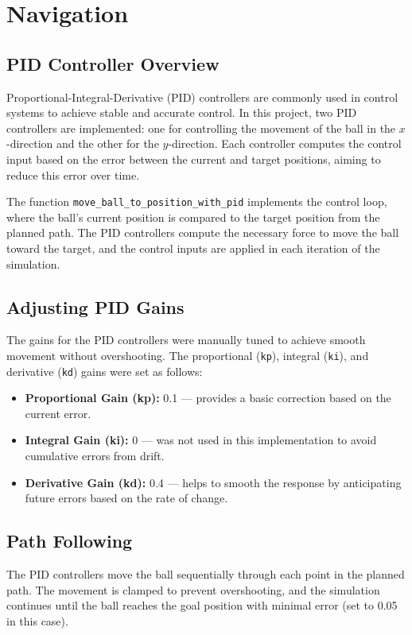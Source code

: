 \documentclass[12pt]{article}
\begin{document}
\section{Navigation}

\subsection{PID Controller Overview}
Proportional-Integral-Derivative (PID) controllers are commonly used in control systems to achieve stable and accurate control. In this project, two PID controllers are implemented: one for controlling the movement of the ball in the $x$-direction and the other for the $y$-direction. Each controller computes the control input based on the error between the current and target positions, aiming to reduce this error over time.

The function \texttt{move\_ball\_to\_position\_with\_pid} implements the control loop, where the ball’s current position is compared to the target position from the planned path. The PID controllers compute the necessary force to move the ball toward the target, and the control inputs are applied in each iteration of the simulation.

\subsection{Adjusting PID Gains}
The gains for the PID controllers were manually tuned to achieve smooth movement without overshooting. The proportional (\texttt{kp}), integral (\texttt{ki}), and derivative (\texttt{kd}) gains were set as follows:
\begin{itemize}
    \item \textbf{Proportional Gain (kp):} 0.1 — provides a basic correction based on the current error.
    \item \textbf{Integral Gain (ki):} 0 — was not used in this implementation to avoid cumulative errors from drift.
    \item \textbf{Derivative Gain (kd):} 0.4 — helps to smooth the response by anticipating future errors based on the rate of change.
\end{itemize}

\subsection{Path Following}
The PID controllers move the ball sequentially through each point in the planned path. The movement is clamped to prevent overshooting, and the simulation continues until the ball reaches the goal position with minimal error (set to 0.05 in this case).
\end{document}
